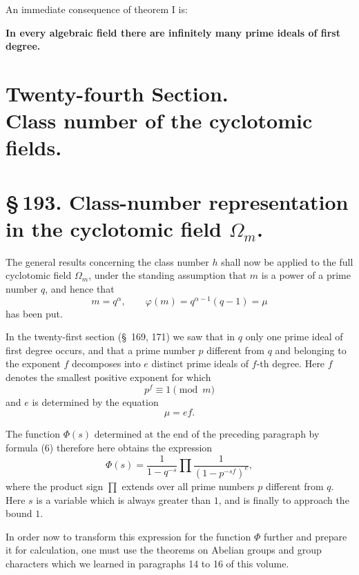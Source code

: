 \documentclass[11pt]{article}
\begin{document}
An immediate consequence of theorem I is:
\begin{center}
\textbf{In every algebraic field there are infinitely many prime ideals of first degree.}
\end{center}

\section*{Twenty-fourth Section.\\Class number of the cyclotomic fields.}
\section*{\S\,193. Class-number representation in the cyclotomic field $\Omega_m$.}

The general results concerning the class number $h$ shall now be applied to the full cyclotomic field $\Omega_m$, under the standing assumption that $m$ is a power of a prime number $q$, and hence that
\begin{equation}
m=q^\alpha,\qquad \varphi(m)=q^{\alpha-1}(q-1)=\mu
\tag{1}
\end{equation}
has been put.

In the twenty-first section (\S~169, 171) we saw that in $q$ only one prime ideal of first degree occurs, and that a prime number $p$ different from $q$ and belonging to the exponent $f$ decomposes into $e$ distinct prime ideals of $f$-th degree. Here $f$ denotes the smallest positive exponent for which
\begin{equation}
p^f\equiv1\pmod m
\tag{2}
\end{equation}
and $e$ is determined by the equation
\begin{equation}
\mu=ef.
\tag{3}
\end{equation}

The function $\Phi(s)$ determined at the end of the preceding paragraph by formula (6) therefore here obtains the expression
\begin{equation}
\Phi(s)=\frac1{1-q^{-s}}\prod\frac1{(1-p^{-sf})^e},
\tag{4}
\end{equation}
where the product sign $\prod$ extends over all prime numbers $p$ different from $q$. Here $s$ is a variable which is always greater than $1$, and is finally to approach the bound $1$.

In order now to transform this expression for the function $\Phi$ further and prepare it for calculation, one must use the theorems on Abelian groups and group characters which we learned in paragraphs 14 to 16 of this volume.
\end{document}
